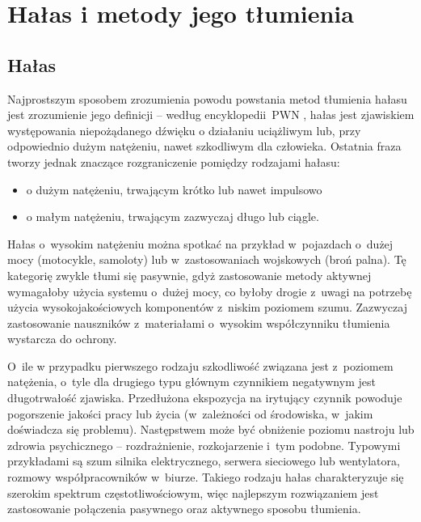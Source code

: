 \chapter{Hałas i metody jego tłumienia}
\label{cha:teoria}

\section{Hałas}
\label{sec:hałas}
Najprostszym sposobem zrozumienia powodu powstania metod tłumienia hałasu jest zrozumienie jego definicji -- według encyklopedii~PWN \cite{PWN}, hałas jest zjawiskiem występowania niepożądanego dźwięku o działaniu uciążliwym lub, przy odpowiednio dużym natężeniu, nawet szkodliwym dla człowieka. Ostatnia fraza tworzy jednak znaczące rozgraniczenie pomiędzy rodzajami hałasu:
\begin{itemize}
	\item o dużym natężeniu, trwającym krótko lub nawet impulsowo
	\item o małym natężeniu, trwającym zazwyczaj długo lub ciągle.
\end{itemize}
Hałas o~wysokim natężeniu można spotkać na przykład w~pojazdach o~dużej mocy (motocykle, samoloty) lub w~zastosowaniach wojskowych (broń palna). Tę kategorię zwykle tłumi się pasywnie, gdyż zastosowanie metody aktywnej wymagałoby użycia systemu o~dużej mocy, co byłoby drogie z~uwagi na potrzebę użycia wysokojakościowych komponentów z~niskim poziomem szumu. Zazwyczaj zastosowanie nauszników z~materiałami o~wysokim współczynniku tłumienia %
wystarcza do ochrony.

O~ile w przypadku pierwszego rodzaju szkodliwość związana jest z~poziomem natężenia, o~tyle dla drugiego typu głównym czynnikiem negatywnym jest długotrwałość zjawiska. Przedłużona ekspozycja na irytujący czynnik powoduje pogorszenie jakości pracy lub życia (w~zależności od środowiska, w~jakim doświadcza się problemu). Następstwem może być obniżenie poziomu nastroju lub zdrowia psychicznego -- rozdrażnienie, rozkojarzenie i~tym podobne. Typowymi przykładami są szum silnika elektrycznego, serwera sieciowego lub wentylatora, rozmowy współpracowników w~biurze. Takiego rodzaju hałas charakteryzuje się szerokim spektrum częstotliwościowym, więc najlepszym rozwiązaniem jest zastosowanie połączenia pasywnego oraz aktywnego sposobu tłumienia. 
